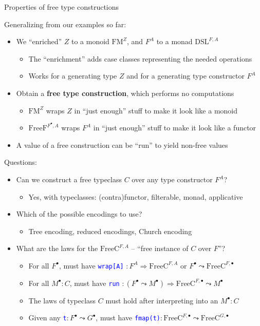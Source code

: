\documentclass[english,,russian]{beamer}
\begin{document}
\begin{frame}{Properties of free type constructions}

Generalizing from our examples so far:
\begin{itemize}
\item We ``enriched'' $Z$ to a monoid $\text{FM}^{Z}$, and $F^{A}$
to a monad $\text{DSL}^{F,A}$ 
\begin{itemize}
\item The ``enrichment'' adds case classes representing the needed operations
\item Works for a generating type $Z$ and for a generating type constructor
$F^{A}$
\end{itemize}
\item Obtain a \textbf{free type construction}, which performs no computations
\begin{itemize}
\item $\text{FM}^{Z}$ wraps $Z$ in ``just enough'' stuff to make it
look like a monoid
\item $\text{FreeF}^{F^{\bullet},A}$ wraps $F^{A}$ in ``just enough''
stuff to make it look like a functor
\end{itemize}
\item A value of a free construction can be ``run'' to yield non-free
values 
\end{itemize}
Questions:
\begin{itemize}
\item Can we construct a free typeclass $C$ over any type constructor $F^{A}$?
\begin{itemize}
\item Yes, with typeclasses: (contra)functor, filterable, monad, applicative
\end{itemize}
\item Which of the possible encodings to use?
\begin{itemize}
\item Tree encoding, reduced encodings, Church encoding
\end{itemize}
\item What are the laws for the{\footnotesize{} $\text{FreeC}^{F,A}$} --
``free instance of $C$ over $F$''?
\begin{itemize}
\item For all $F^{\bullet}$, must have \texttt{\textcolor{blue}{\footnotesize{}wrap{[}A{]}}}
$:F^{A}\Rightarrow\text{FreeC}^{F,A}$ or $F^{\bullet}\leadsto\text{FreeC}^{F,\bullet}$
\item For all $M^{\bullet}:C$, must have \texttt{\textcolor{blue}{\footnotesize{}run}}
$:\left(F^{\bullet}\leadsto M^{\bullet}\right)\Rightarrow\text{FreeC}^{F,\bullet}\leadsto M^{\bullet}$
\item The laws of typeclass $C$ must hold after interpreting into an $M^{\bullet}:C$
\item Given any \texttt{\textcolor{blue}{\footnotesize{}t}}$:F^{\bullet}\leadsto G^{\bullet}$,
must have \texttt{\textcolor{blue}{\footnotesize{}fmap(t)}}$:\text{FreeC}^{F,\bullet}\leadsto\text{FreeC}^{G,\bullet}$
\end{itemize}
\end{itemize}
\end{frame}
\end{document}
